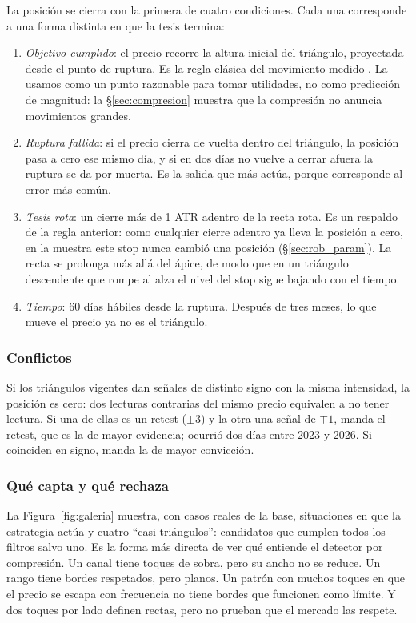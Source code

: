 \documentclass[10pt,a4paper]{article}
\begin{document}
La posición se cierra con la primera de cuatro condiciones. Cada una corresponde a una
forma distinta en que la tesis termina:
\begin{enumerate}[label=(\roman*)]
  \item \emph{Objetivo cumplido}: el precio recorre la altura inicial del triángulo,
        proyectada desde el punto de ruptura. Es la regla clásica del movimiento medido
        \citep{edwards2018}. La usamos como un punto razonable para tomar utilidades,
        no como predicción de magnitud: la §\ref{sec:compresion} muestra que la
        compresión no anuncia movimientos grandes.
  \item \emph{Ruptura fallida}: si el precio cierra de vuelta dentro del triángulo, la
        posición pasa a cero ese mismo día, y si en dos días no vuelve a cerrar afuera
        la ruptura se da por muerta. Es la salida que más actúa, porque corresponde al
        error más común.
  \item \emph{Tesis rota}: un cierre más de 1 ATR adentro de la recta rota. Es un
        respaldo de la regla anterior: como cualquier cierre adentro ya lleva la
        posición a cero, en la muestra este stop nunca cambió una posición
        (§\ref{sec:rob_param}). La recta se prolonga más allá del ápice, de modo que
        en un triángulo descendente que rompe al alza el nivel del stop sigue bajando
        con el tiempo.
  \item \emph{Tiempo}: 60 días hábiles desde la ruptura. Después de tres meses, lo que
        mueve el precio ya no es el triángulo.
\end{enumerate}

\subsubsection{Conflictos}

Si los triángulos vigentes dan señales de distinto signo con la misma intensidad, la
posición es cero: dos lecturas contrarias del mismo precio equivalen a no tener
lectura. Si una de ellas es un retest ($\pm3$) y la otra una señal de $\mp1$, manda el
retest, que es la de mayor evidencia; ocurrió dos días entre 2023 y 2026. Si coinciden
en signo, manda la de mayor convicción.

\subsubsection{Qué capta y qué rechaza}

La Figura~\ref{fig:galeria} muestra, con casos reales de la base, situaciones en que la
estrategia actúa y cuatro ``casi-triángulos'': candidatos que cumplen todos los filtros
salvo uno. Es la forma más directa de ver qué entiende el detector por compresión. Un
canal tiene toques de sobra, pero su ancho no se reduce. Un rango tiene bordes
respetados, pero planos. Un patrón con muchos toques en que el precio se escapa con
frecuencia no tiene bordes que funcionen como límite. Y dos toques por lado definen
rectas, pero no prueban que el mercado las respete.
\end{document}
